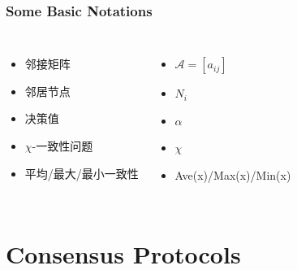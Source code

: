 \documentclass{beamer}
\begin{document}
\begin{frame}
    \frametitle{Some Basic Notations}
    
    \begin{columns}
    
    \begin{itemize}
    \item 邻接矩阵
    \item 邻居节点
    \item 决策值
    \item $\chi$-一致性问题
    \item 平均/最大/最小一致性
    \end{itemize}
    
    \begin{itemize}
        \item $\mathcal{A}=[a_{ij}]$
        \item $N_i$
        \item $\alpha$
        \item $\chi$
        \item Ave(x)/Max(x)/Min(x)
    \end{itemize}

    \end{columns}
    \end{frame}

\section{Consensus Protocols}
\end{document}
